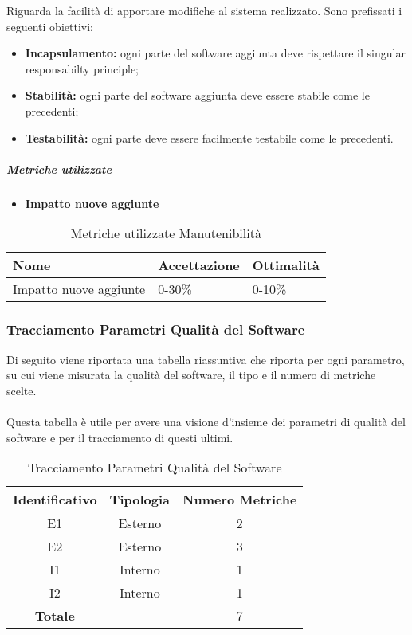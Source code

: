 Riguarda la facilità di apportare modifiche al sistema realizzato. Sono prefissati i seguenti obiettivi:
\begin{itemize}
	\item \textbf{Incapsulamento:} ogni parte del software aggiunta deve rispettare il singular responsabilty principle\pedice;
	\item \textbf{Stabilità:} ogni parte del software aggiunta deve essere stabile come le precedenti;
	\item \textbf{Testabilità:} ogni parte deve essere facilmente testabile come le precedenti.
\end{itemize}

\subparagraph{Metriche utilizzate}
\begin{itemize}
	\item \textbf{Impatto nuove aggiunte}
\end{itemize}
\begin{table}[H]
	\centering
	\renewcommand{\arraystretch}{2} 
		\begin{tabular}{|l|l|l|}
			\rowcolor{orange!50}
			\hline
			\textbf{Nome} & \textbf{Accettazione} & \textbf{Ottimalità} \\ \hline
			Impatto nuove aggiunte        &           0-30\%            &      0-10\%         \\ \hline                       
		\end{tabular}
	\caption{Metriche utilizzate Manutenibilità}
\end{table}

\subsubsection{Tracciamento Parametri Qualità del Software}
Di seguito viene riportata una tabella riassuntiva che riporta per ogni parametro, su cui viene misurata la qualità del software, il tipo e il numero di metriche scelte. \\ \\ Questa tabella è utile per avere una visione d'insieme dei parametri di qualità del software e per il tracciamento di questi ultimi.

\begin{table}[H]
	\centering
	\renewcommand{\arraystretch}{2} 
		\begin{tabular}{|c|c|c|}
			\rowcolor{orange!50}
			\hline
			\textbf{Identificativo} & \textbf{Tipologia} & \textbf{Numero Metriche} \\ \hline
			E1 & Esterno & 2 \\ \hline
			E2 & Esterno & 3 \\ \hline                       
			I1 & Interno & 1 \\ \hline                       
			I2 & Interno & 1 \\ \hline                       
			\textbf{Totale} &  & 7 \\ \hline   
		\end{tabular}
	\caption{Tracciamento Parametri Qualità del Software}
\end{table}

\clearpage
